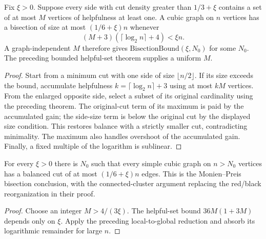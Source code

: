\begin{theorem}
  \label{thm:lowerbounds-algebraic-helpful-reduction}
  \leanok
  Fix $\xi>0$. Suppose every side with cut density greater than
  $1/3+\xi$ contains a set of at most $M$ vertices of helpfulness at
  least one. A cubic graph on $n$ vertices has a bisection of size at most
  $(1/6+\xi)n$ whenever
  \[
    (M+3)(\lceil\log_2 n\rceil+4)<\xi n.
  \]
  A graph-independent $M$ therefore gives
  $\mathrm{BisectionBound}(\xi,N_0)$ for some $N_0$.
  The preceding bounded helpful-set theorem supplies a uniform $M$.
\end{theorem}
\begin{proof}
  \leanok
  Start from a minimum cut with one side of size $\lfloor n/2\rfloor$.
  If its size exceeds the bound, accumulate helpfulness
  $k=\lceil\log_2 n\rceil+3$ using at most $kM$ vertices.
  From the enlarged opposite side, select a subset of its original
  cardinality using the preceding theorem. The original-cut term of
  its maximum is paid by the accumulated gain; the side-size term is
  below the original cut by the displayed size condition. This restores
  balance with a strictly smaller cut, contradicting minimality.
  The maximum also handles overshoot of the accumulated gain.
  Finally, a fixed multiple of the logarithm is sublinear.
\end{proof}

\begin{theorem}
  \label{thm:lowerbounds-algebraic-sharp-bisection}
  \leanok
  For every $\xi>0$ there is $N_0$ such that every simple cubic graph on
  $n>N_0$ vertices has a balanced cut of at most $(1/6+\xi)n$ edges.
  This is the Monien--Preis bisection conclusion, with the connected-cluster
  argument replacing the red/black reorganization in their proof.
\end{theorem}
\begin{proof}
  \leanok
  Choose an integer $M>4/(3\xi)$. The helpful-set bound
  $36M(1+3M)$ depends only on $\xi$. Apply the preceding local-to-global
  reduction and absorb its logarithmic remainder for large $n$.
\end{proof}

